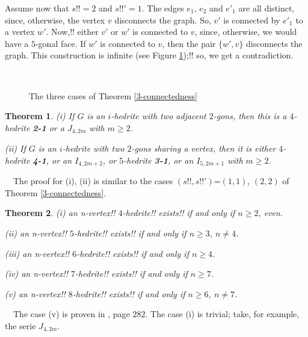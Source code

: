 \documentclass[12pt]{article}
\newtheorem{theorem}{Theorem}
\newcommand{\proof}{\noindent{\bf Proof.}\ \ }
\begin{document}
Assume now that $s!!=2$ and $s!!'=1$. The edges $e_1$, $e_2$ and $e'_1$ are
all distinct, since, otherwise, the vertex $v$ disconnects the graph.
So, $v'$ is connected by $e'_1$ to a vertex $w'$. Now,!! either $v'$ or $w'$
is connected to $v$, since, otherwise, we would have a $5$-gonal face.
If $w'$ is connected to $v$, then the pair $\{w', v\}$ disconnects the graph.
This construction is infinite (see Figure \ref{fig:TheThreeCases});!! so,
we get a contradiction.




\begin{figure}
\centering
\mbox{
}
\caption{The three cases of Theorem \ref{3-connectedness}}
\label{fig:TheThreeCases}
\end{figure}



\begin{theorem}
(i) If $G$ is an $i$-hedrite with two adjacent $2$-gons, then 
this is a $4$-hedrite {\bf 2-1} or a $J_{4,2m}$ with $m\geq 2$.

(ii) If $G$ is an $i$-hedrite with two $2$-gons sharing a vertex, then 
it is either $4$-hedrite {\bf 4-1}, or an $I_{4,2m+2}$, or $5$-hedrite 
{\bf 3-1}, or an $I_{5,2m+1}$ with $m\geq 2$.

\end{theorem}

\proof The proof for (i), (ii) is similar to the cases $(s!!,s!!')$=$(1,1)$, $(2,2)$ of Theorem \ref{3-connectedness}.




\begin{theorem}

(i) an n-vertex!! $4$-hedrite!! exists!! if and only if $n\geq 2$, even.

(ii) an n-vertex!! $5$-hedrite!! exists!! if and only if $n\geq 3$, $n\not= 4$.

(iii) an n-vertex!! $6$-hedrite!! exists!! if and only if $n\geq 4$.

(iv) an n-vertex!! $7$-hedrite!! exists!! if and only if $n\geq 7$.

(v) an n-vertex!! $8$-hedrite!! exists!! if and only if $n\geq 6$, $n\not= 7$.

\end{theorem}
\proof The case (v) is proven in \cite{Gr}, page 282.
The case (i) is trivial; take, for example, the serie $J_{4,2m}$.
\end{document}
